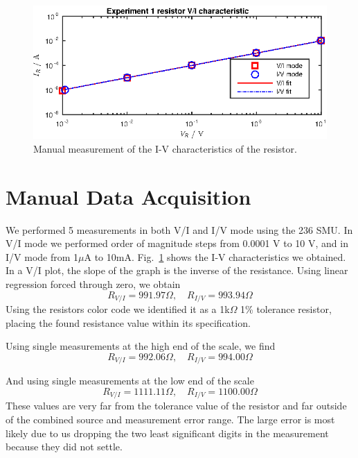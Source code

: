 


\newpage
\begin{figure}
    \center
    \includegraphics[width=\textwidth]{manual-measure.eps}
    \caption{Manual measurement of the I-V characteristics of the resistor. }
    \label{fig:manual-measure}
\end{figure}
\section{Manual Data Acquisition}
We performed 5 measurements in both V/I and I/V mode using the 236 SMU. In V/I mode we 
performed order of magnitude steps from 0.0001 V to 10 V, and in I/V mode from 1\(\mu\)A to
10mA. Fig.~\ref{fig:manual-measure} shows the I-V characteristics we obtained. In a V/I
plot, the slope of the graph is the inverse of the resistance. Using linear regression forced
through zero, we obtain
\begin{equation*}
    R_{V/I} = 991.97\Omega, \quad R_{I/V} = 993.94 \Omega
\end{equation*}
Using the resistors color code we identified it as a 1k\(\Omega\) 1\% tolerance resistor, placing
the found resistance value within its specification.

Using single measurements at the high end of the scale, we find 
\begin{equation*}
    R_{V/I} = 992.06\Omega,\quad R_{I/V} = 994.00\Omega
\end{equation*}

And using single measurements at the low end of the scale
\begin{equation*}
    R_{V/I} = 1111.11\Omega, \quad R_{I/V} = 1100.00\Omega
\end{equation*}
These values are very far from the tolerance value of the resistor and far outside
of the combined source and measurement error range. The large error is most likely
due to us dropping the two least significant digits in the measurement because they did
not settle.

